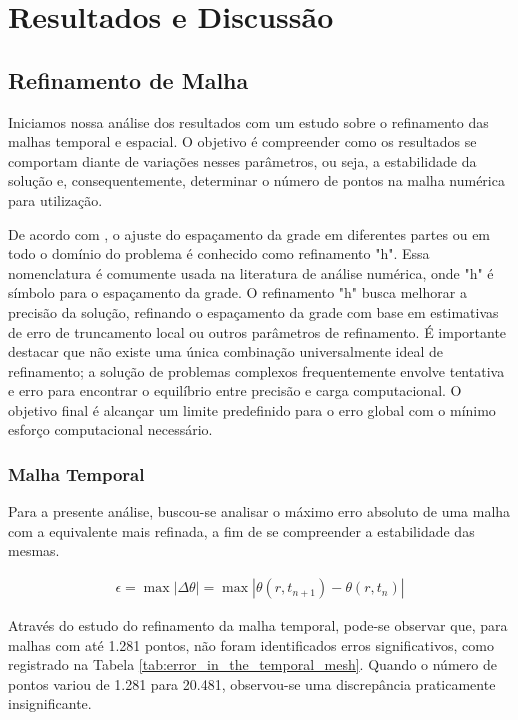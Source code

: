 \chapter{Resultados e Discussão} \label{chap:results}

\section{Refinamento de Malha}

Iniciamos nossa análise dos resultados com um estudo sobre o refinamento das malhas temporal e espacial. O objetivo é compreender como os resultados se comportam diante de variações nesses parâmetros, ou seja, a estabilidade da solução e, consequentemente, determinar o número de pontos na malha numérica para utilização.

De acordo com \citet{schiesser2009}, o ajuste do espaçamento da grade em diferentes partes ou em todo o domínio do problema é conhecido como refinamento "h". Essa nomenclatura é comumente usada na literatura de análise numérica, onde "h" é símbolo para o espaçamento da grade. O refinamento "h" busca melhorar a precisão da solução, refinando o espaçamento da grade com base em estimativas de erro de truncamento local ou outros parâmetros de refinamento. É importante destacar que não existe uma única combinação universalmente ideal de refinamento; a solução de problemas complexos frequentemente envolve tentativa e erro para encontrar o equilíbrio entre precisão e carga computacional. O objetivo final é alcançar um limite predefinido para o erro global com o mínimo esforço computacional necessário.

\subsection{Malha Temporal}

Para a presente análise, buscou-se analisar o máximo erro absoluto de uma malha com a equivalente mais refinada, a fim de se compreender a estabilidade das mesmas.

\begin{gather}
    \epsilon = \max | \Delta \theta | = \max | \theta(r,t_{n+1}) - \theta(r,t_{n}) |
\end{gather}

Através do estudo do refinamento da malha temporal, pode-se observar que, para malhas com até 1.281 pontos, não foram identificados erros significativos, como registrado na Tabela \ref{tab:error_in_the_temporal_mesh}. Quando o número de pontos variou de 1.281 para 20.481, observou-se uma discrepância praticamente insignificante.

